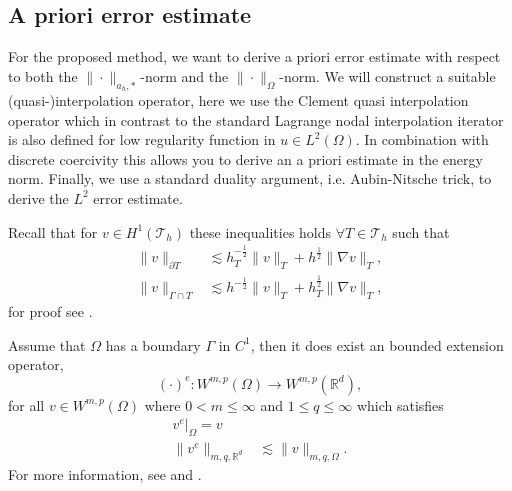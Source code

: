 
\subsection{A priori error estimate}%
\label{sec:a_priori_estimates}


For the proposed method, we want to derive a priori error estimate with respect to both the  $\| \cdot  \|_{a_{h},*   }^{  } $-norm and the  $\| \cdot  \|_{ \Omega  }^{
} $-norm.
We will construct a suitable (quasi-)interpolation operator, here we use the Clement quasi interpolation operator which in contrast to the standard Lagrange nodal interpolation iterator is also defined for low regularity function in $u \in L^{2}(
\Omega ) $.
In combination with discrete coercivity this allows you to derive an a priori estimate in the energy norm. Finally, we use a standard duality argument, i.e. Aubin-Nitsche trick, to derive the $L^{2}$ error estimate.

Recall that for $v \in H^{1}( \mathcal{T } _{h}) $ these inequalities holds $\forall T \in \mathcal{T} _{h}$ such that \[
\begin{split}
    \| v \|_{ \partial T }^{  } &\lesssim h^{-\frac{1}{2}}_{T}\|  v \|_{ T }^{  }+ h^{\frac{1}{2}} \| \nabla v \|_{T  }^{   }  , \\
    \| v \|_{ \Gamma \cap T }^{  } &\lesssim  h^{-\frac{1}{2}} \| v \|_{T  }^{  }   + h^{\frac{1}{2}}_{T} \| \nabla v \|_{ T }^{  },
\end{split}
\]
for proof see \cite[Lemma 4.2]{hansbo2003finite}.

Assume that $\Omega $ has a boundary $\Gamma $ in $C^{1}$, then it does exist an bounded extension operator, \[
    ( \cdot ) ^{e}: W^{m,p}( \Omega )  \to W^{m,p} ( \mathbb{R} ^{d}),
\]
for all  $v \in W^{m,p}( \Omega )$ where $0< m \le \infty$ and $1 \le q \le \infty$ which satisfies \[
    \begin{split}
 v^{e}| _{\Omega } =   v  \\
\| v^{e} \|_{ m,q,\mathbb{R} ^{d}  }^{  } & \lesssim \| v \|_{ m,q, \Omega  }^{  }.
    \end{split}
\]
For more information, see \cite[Theorem 9.7]{brezis2011functional} and \cite[p.181, p.185]{stein1970singular}.

